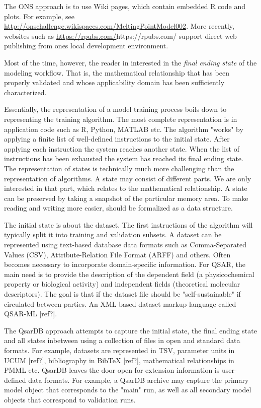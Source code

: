 \documentclass[12pt,letterpaper]{article}
\begin{document}
The ONS approach is to use Wiki pages, which contain embedded R code
and plots. For example, see
\url{http://onschallenge.wikispaces.com/MeltingPointModel002}. More
recently, websites such as
\url{https://rpubs.com/}{https://rpubs.com/} support direct web
publishing from ones local development environment.

Most of the time, however, the reader in interested in the \emph{final
ending state} of the modeling workflow. That is, the mathematical 
relationship that has been properly validated and whose applicability 
domain has been sufficiently characterized. 

Essentially, the representation of a model training process boils down
to representing the training algorithm. The most complete representation
is in application code such as R, Python, MATLAB etc.
The algorithm "works" by applying a finite list of well-defined 
instructions to the initial state. After applying each instruction the
system reaches another state. When the list of instructions has been
exhausted the system has reached its final ending state.
The representation of states is technically much more challenging than 
the representation of algorithms. A state may consist of different
parts. We are only interested in that part, which relates to the 
mathematical relationship. A state can be preserved by taking a snapshot
of the particular memory area. To make reading and writing more easier,
should be formalized as a data structure.

The initial state is about the dataset. The first instructions of the
algorithm will typically split it into training and validation subsets.
A dataset can be represented using text-based database data formats such
as Comma-Separated Values (CSV), Attribute-Relation File Format (ARFF)
and others. Often becomes necessary to incorporate domain-specific
information. For QSAR, the main need is to provide the description of
the dependent field (a physicochemical property or biological activity)
and independent fields (theoretical molecular descriptors). The goal is
that if the dataset file should be "self-sustainable" if circulated
between parties. An XML-based dataset markup language called QSAR-ML [ref?].

The QsarDB approach \cite{Aruoja:2014bq,Ruusmann:2014uk} attempts to
capture the initial state, the final ending state and all states
inbetween using a collection of files in open and standard data
formats. For example, datasets are represented in TSV, parameter units
in UCUM [ref?], bibliography in BibTeX [ref?], mathematical
relationships in PMML etc. QsarDB leaves the door open for extension
information is user-defined data formats. For example, a QsarDB
archive may capture the primary model object that corresponds to the
"main" run, as well as all secondary model objects that correspond to
validation runs.
\end{document}
